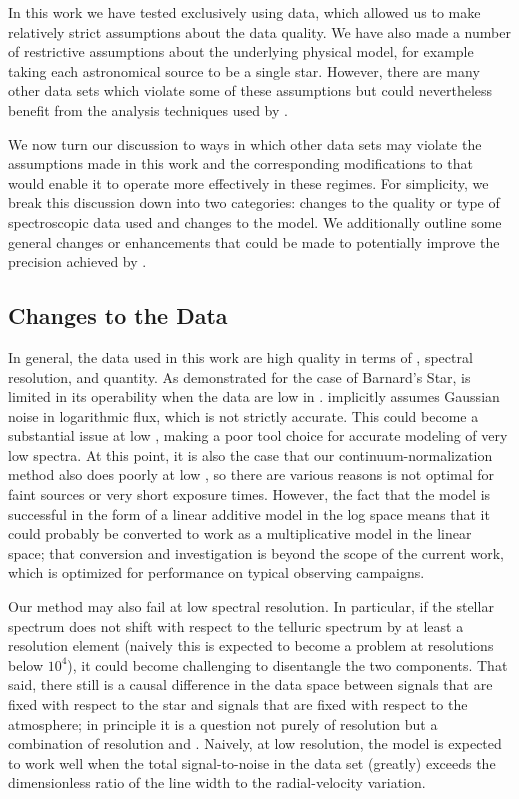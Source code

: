 \documentclass[modern]{aastex62}
\newcommand{\Mdwarf}{Barnard's Star\xspace} %
\begin{document}
In this work we have tested \wobble exclusively using \HARPS data, which allowed us to make relatively strict assumptions about the data quality. 
We have also made a number of restrictive assumptions about the underlying physical model, for example taking each astronomical source to be a single star. 
However, there are many other \EPRV data sets which violate some of these assumptions but could nevertheless benefit from the analysis techniques used by \wobble.
 
We now turn our discussion to ways in which other data sets may violate the assumptions made in this work and the corresponding modifications to \wobble that would enable it to operate more effectively in these regimes. 
For simplicity, we break this discussion down into two categories: changes to the quality or type of spectroscopic data used and changes to the model. 
We additionally outline some general changes or enhancements that could be made to potentially improve the \RV precision achieved by \wobble. 

\subsection{Changes to the Data}
\label{s:data-changes}

In general, the data used in this work are high quality in terms of \SNR, spectral resolution, and quantity. 
As demonstrated for the case of \Mdwarf, \wobble is limited in its operability when the data are low in \SNR. 
\wobble implicitly assumes Gaussian noise in logarithmic flux, which is not strictly accurate. 
This could become a substantial issue at low \SNR, making \wobble a poor tool choice for accurate modeling of very low \SNR spectra.
At this point, it is also the case that our continuum-normalization method also does poorly at low \SNR, so there are various reasons \wobble is not optimal for faint sources or very short exposure times.
However, the fact that the model is successful in the form of a linear additive model in the log space means that it could probably be converted to work as a multiplicative model in the linear space; that conversion and investigation is beyond the scope of the current work, which is optimized for performance on typical \HARPS observing campaigns.

Our method may also fail at low spectral resolution. 
In particular, if the stellar spectrum does not shift with respect to the telluric spectrum by at least a resolution element (naively this is expected to become a problem at resolutions below $10^4$), it could become challenging to disentangle the two components.
That said, there still is a causal difference in the data space between signals that are fixed with respect to the star and signals that are fixed with respect to the atmosphere; in principle it is a question not purely of resolution but a combination of resolution and \SNR.
Naively, at low resolution, the model is expected to work well when the total signal-to-noise in the data set (greatly) exceeds the dimensionless ratio of the line width to the radial-velocity variation.
\end{document}
